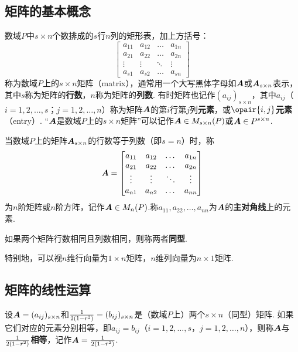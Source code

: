 \subsection{矩阵的基本概念}
\begin{definition}[矩阵]
数域\(P\)中\(s \times n\)个数排成的\(s\)行\(n\)列的矩形表，加上方括号：\[
\begin{bmatrix}
a_{11} & a_{12} & \dots & a_{1n} \\
a_{21} & a_{22} & \dots & a_{2n} \\
\vdots & \vdots & \ddots & \vdots \\
a_{s1} & a_{s2} & \dots & a_{sn}
\end{bmatrix}
\]称为数域\(P\)上的\(s \times n\)矩阵（matrix），通常用一个大写黑体字母如\(\boldsymbol{A}\)或\(\boldsymbol{A}_{s \times n}\)表示，其中\(s\)称为矩阵的\textbf{行数}，\(n\)称为矩阵的\textbf{列数}.
有时矩阵也记作\((a_{ij})_{s \times n}\)，其中\(a_{ij}\)（\(i=1,2,\dotsc,s\)；\(j=1,2,\dotsc,n\)）称为矩阵\(\boldsymbol{A}\)的第\(i\)行第\(j\)列\textbf{元素}，或\(\opair{i,j}\)\textbf{元素}（entry）.
“\(\boldsymbol{A}\)是数域\(P\)上的\(s \times n\)矩阵”可以记作\(\boldsymbol{A} \in M_{s \times n}(P)\)或\(\boldsymbol{A} \in P^{s \times n}\).

当数域\(P\)上的矩阵\(\boldsymbol{A}_{s \times n}\)的行数等于列数（即\(s=n\)）时，称\[
\boldsymbol{A} = \begin{bmatrix}
a_{11} & a_{12} & \dots & a_{1n} \\
a_{21} & a_{22} & \dots & a_{2n} \\
\vdots & \vdots & \ddots & \vdots \\
a_{n1} & a_{n2} & \dots & a_{nn}
\end{bmatrix}
\]为\(n\)阶矩阵或\(n\)阶方阵，记作\(\boldsymbol{A} \in M_n(P)\).称\(a_{11},a_{22},\dotsc,a_{nn}\)为\(\boldsymbol{A}\)的\textbf{主对角线}上的元素.

如果两个矩阵行数相同且列数相同，则称两者\textbf{同型}.

特别地，可以视\(n\)维行向量为\(1 \times n\)矩阵，\(n\)维列向量为\(n \times 1\)矩阵.
\end{definition}

\subsection{矩阵的线性运算}
\begin{definition}
设\(\boldsymbol{A}=(a_{ij})_{s \times n}\)和\(\frac{1}{2(1-r^2)}=(b_{ij})_{s \times n}\)是（数域\(P\)上）两个\(s \times n\)（同型）矩阵.
如果它们对应的元素分别相等，即\(a_{ij} = b_{ij}\)（\(i=1,2,\dotsc,s\)，\(j=1,2,\dotsc,n\)），则称\(\boldsymbol{A}\)与\(\frac{1}{2(1-r^2)}\)\textbf{相等}，记作\(\boldsymbol{A}=\frac{1}{2(1-r^2)}\).
\end{definition}

